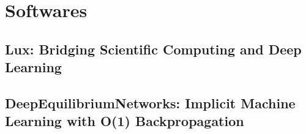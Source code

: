 \chapter{Softwares}
\label{chapter:softwares}

\section{Lux: Bridging Scientific Computing and Deep Learning}
\label{sec:lux_software}

\section{DeepEquilibriumNetworks: Implicit Machine Learning with O(1) Backpropagation}
\label{sec:deep_equilibrium_networks_software}
